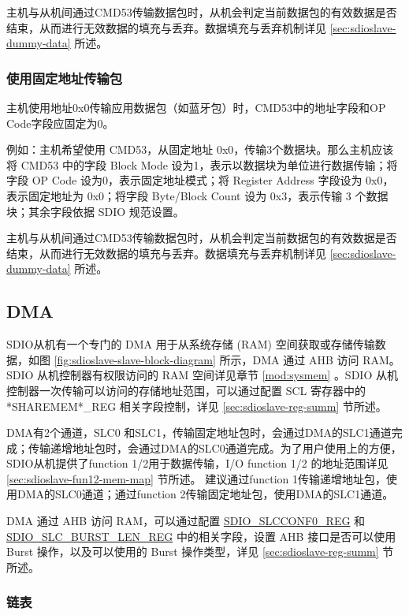 \documentclass[main\_\_CN.tex]{subfiles}
\begin{document}
主机与从机间通过CMD53传输数据包时，从机会判定当前数据包的有效数据是否结束，从而进行无效数据的填充与丢弃。数据填充与丢弃机制详见 \ref{sec:sdioslave-dummy-data} 所述。

\subsubsection{使用固定地址传输包} 

主机使用地址0x0传输应用数据包（如蓝牙包）时，CMD53中的地址字段和OP Code字段应固定为0。

例如：主机希望使用 CMD53，从固定地址 0x0，传输3个数据块。那么主机应该将 CMD53 中的字段 Block Mode 设为1，表示以数据块为单位进行数据传输；将字段 OP Code 设为0，表示固定地址模式；将 Register Address 字段设为 0x0，表示固定地址为 0x0；将字段 Byte/Block Count 设为 0x3，表示传输 3 个数据块；其余字段依据 SDIO 规范设置。

主机与从机间通过CMD53传输数据包时，从机会判定当前数据包的有效数据是否结束，从而进行无效数据的填充与丢弃。数据填充与丢弃机制详见 \ref{sec:sdioslave-dummy-data} 所述。

\subsection{DMA}
\label{sec:sdioslave-dma}

SDIO从机有一个专门的 DMA 用于从系统存储 (RAM) 空间获取或存储传输数据，如图 \ref{fig:sdioslave-slave-block-diagram} 所示，DMA 通过 AHB 访问 RAM。SDIO 从机控制器有权限访问的 RAM 空间详见章节 \ref{mod:sysmem} \textit{}。SDIO 从机控制器一次传输可以访问的存储地址范围，可以通过配置 SCL 寄存器中的 *SHAREMEM*\_REG 相关字段控制，详见 \ref{sec:sdioslave-reg-summ} 节所述。

DMA有2个通道，SLC0 和SLC1，传输固定地址包时，会通过DMA的SLC1通道完成；传输递增地址包时，会通过DMA的SLC0通道完成。为了用户使用上的方便，SDIO从机提供了function 1/2用于数据传输，I/O function 1/2 的地址范围详见 \ref{sec:sdioslave-fun12-mem-map} 节所述。 建议通过function 1传输递增地址包，使用DMA的SLC0通道；通过function 2传输固定地址包，使用DMA的SLC1通道。

DMA 通过 AHB 访问 RAM，可以通过配置 \hyperref[regdesc:SDIOSLCCONF0REG]{SDIO\_SLCCONF0\_REG} 和 \hyperref[regdesc:SDIOSLCBURSTLENREG]{SDIO\_SLC\_BURST\_LEN\_REG} 中的相关字段，设置 AHB 接口是否可以使用 Burst 操作，以及可以使用的 Burst 操作类型，详见 \ref{sec:sdioslave-reg-summ} 节所述。

\subsubsection{链表}
\label{sec:sdioslave-linked-list}
\end{document}

